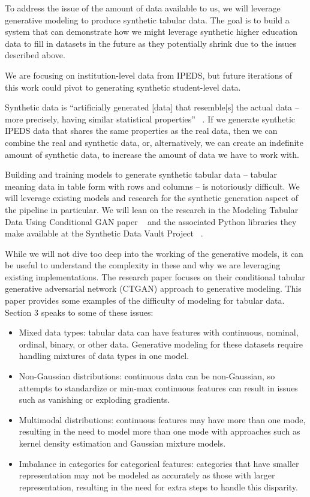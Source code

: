 \documentclass[sigconf, authorversion, nonacm]{acmart}
\begin{document}
   To address the issue of the amount of data available to us, we will leverage generative modeling to produce synthetic tabular data. The goal is to build a system that can demonstrate how we might leverage synthetic higher education data to fill in datasets in the future as they potentially shrink due to the issues described above.

    We are focusing on institution-level data from IPEDS, but future iterations of this work could pivot to generating synthetic student-level data.

    Synthetic data is ``artificially generated [data] that resemble[s] the actual data -- more precisely, having similar statistical properties'' ~\cite[p. 1]{decristofaro2024syntheticdatamethodsuse}. If we generate synthetic IPEDS data that shares the same properties as the real data, then we can combine the real and synthetic data, or, alternatively, we can create an indefinite amount of synthetic data, to increase the amount of data we have to work with.

    Building and training models to generate synthetic tabular data -- tabular meaning data in table form with rows and columns -- is notoriously difficult. We will leverage existing models and research for the synthetic generation aspect of the pipeline in particular. We will lean on the research in the Modeling Tabular Data Using Conditional GAN paper ~\cite{DBLP:journals/corr/abs-1907-00503} and the associated Python libraries they make available at the Synthetic Data Vault Project ~\cite{sdv}.

    While we will not dive too deep into the working of the generative models, it can be useful to understand the complexity in these and why we are leveraging existing implementations. The research paper focuses on their conditional tabular generative adversarial network (CTGAN) approach to generative modeling. This paper provides some examples of the difficulty of modeling for tabular data. Section 3 speaks to some of these issues:

    \begin{itemize}
        \item Mixed data types: tabular data can have features with continuous, nominal, ordinal, binary, or other data. Generative modeling for these datasets require handling mixtures of data types in one model.
        \item Non-Gaussian distributions: continuous data can be non-Gaussian, so attempts to standardize or min-max continuous features can result in issues such as vanishing or exploding gradients.
        \item Multimodal distributions: continuous features may have more than one mode, resulting in the need to model more than one mode with approaches such as kernel density estimation and Gaussian mixture models.
        \item Imbalance in categories for categorical features: categories that have smaller representation may not be modeled as accurately as those with larger representation, resulting in the need for extra steps to handle this disparity. \cite{DBLP:journals/corr/abs-1907-00503}
    \end{itemize}
\end{document}
